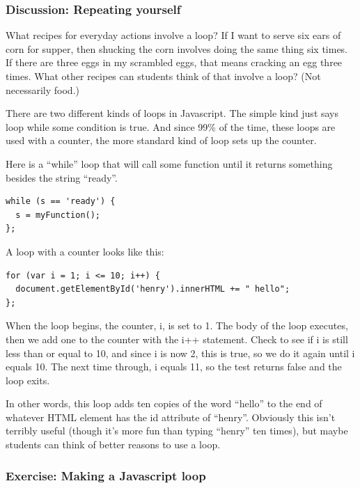 \documentclass[11pt]{article}
\begin{document}
\subsubsection{Discussion: Repeating yourself}

What recipes for everyday actions involve a loop?  If I want to serve
six ears of corn for supper, then shucking the corn involves doing the
same thing six times.  If there are three eggs in my scrambled eggs,
that means cracking an egg three times.  What other recipes can
students think of that involve a loop?  (Not necessarily food.)

There are two different kinds of loops in Javascript.  The simple kind
just says loop while some condition is true.  And since 99\% of the
time, these loops are used with a counter, the more standard kind of
loop sets up the counter.

Here is a ``while'' loop that will call some function until it returns
something besides the string ``ready''.

\begin{verbatim}
while (s == 'ready') {
  s = myFunction();
};
\end{verbatim}

A loop with a counter looks like this:

\begin{verbatim}
for (var i = 1; i <= 10; i++) {
  document.getElementById('henry').innerHTML += " hello";
};
\end{verbatim}

When the loop begins, the counter, i, is set to 1.  The body of the
loop executes, then we add one to the counter with the i++ statement.
Check to see if i is still less than or equal to 10, and since i is
now 2, this is true, so we do it again until i equals 10.  The next
time through, i equals 11, so the test returns false and the loop
exits.

In other words, this loop adds ten copies of the word ``hello'' to the
end of whatever HTML element has the id attribute of ``henry''.
Obviously this isn't terribly useful (though it's more fun than typing
``henry'' ten times), but maybe students can think of better reasons
to use a loop.


\subsubsection{Exercise: Making a Javascript loop}
\end{document}
